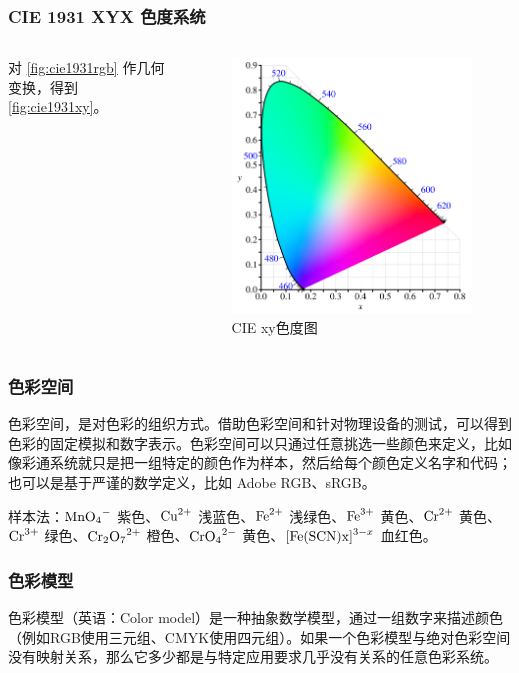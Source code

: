 \documentclass[8pt, aspectratio=169]{ctexbeamer}
\begin{document}
\begin{frame}
	\frametitle{CIE 1931 XYX 色度系统}
	\begin{columns}
		对 \autoref{fig:cie1931rgb} 作几何变换，得到 \autoref{fig:cie1931xy}。
		\begin{figure}
			\includegraphics[width=0.6\linewidth]{cie1931xy.png}
			\caption{CIE xy色度图}
			\label{fig:cie1931xy}
		\end{figure}
	\end{columns}


\end{frame}
\begin{frame}

\end{frame}


\begin{frame}
	\frametitle{色彩空间}
	色彩空间，是对色彩的组织方式。借助色彩空间和针对物理设备的测试，可以得到色彩的固定模拟和数字表示。色彩空间可以只通过任意挑选一些颜色来定义，比如像彩通系统就只是把一组特定的颜色作为样本，然后给每个颜色定义名字和代码；也可以是基于严谨的数学定义，比如 Adobe RGB、sRGB。

	样本法：$\ce{MnO4^-}$ 紫色、$\ce{Cu^2+}$ 浅蓝色、$\ce{Fe^2+}$ 浅绿色、$\ce{Fe^3+}$ 黄色、$\ce{Cr^2+}$ 黄色、$\ce{Cr^3+}$ 绿色、$\ce{Cr2O7^2+}$ 橙色、$\ce{CrO4^2-}$ 黄色、$\ce{[Fe(SCN)x]^{3-x}}$ 血红色。

\end{frame}
\begin{frame}
	\frametitle{色彩模型}

	色彩模型（英语：Color model）是一种抽象数学模型，通过一组数字来描述颜色（例如RGB使用三元组、CMYK使用四元组）。如果一个色彩模型与绝对色彩空间没有映射关系，那么它多少都是与特定应用要求几乎没有关系的任意色彩系统。

\end{frame}
\end{document}
